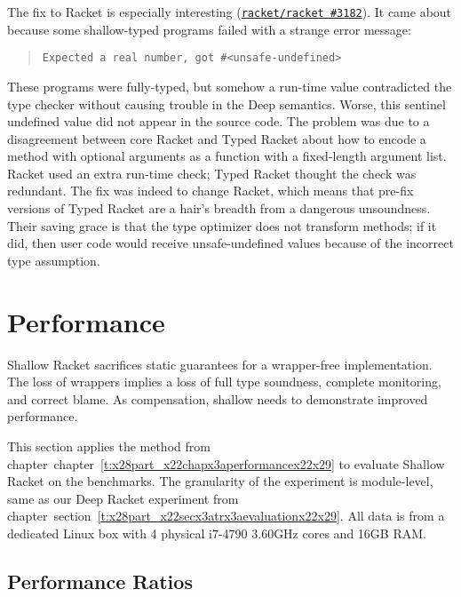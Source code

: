 \documentclass[ twoside,open=right,titlepage,numbers=noenddot,headinclude,%
                footinclude=true,cleardoublepage=empty,abstract=off,
                BCOR=5mm,paper=a4,fontsize=11pt,%
                ngerman,american,%
                parts,pdfspacing]{scrreprt}
\newcommand{\ChapRef}[2]{\SecRef{#1}{#2}}
\newcommand{\SecRef}[2]{section~#1}
\newcommand{\ChapRefLocal}[3]{\hyperref[#1]{\ChapRef{#2}{#3}}}
\newcommand{\SecRefLocal}[3]{\hyperref[#1]{\SecRef{#2}{#3}}}
\newcommand{\Scribtexttt}[1]{{\texttt{#1}}}
\newcommand{\Stttextmore}{{\fontencoding{T1}\selectfont>}}
\newcommand{\Stttextless}{{\fontencoding{T1}\selectfont<}}
\newenvironment{SInsetFlow}{\begin{quote}}{\end{quote}}
\let\SOriginalthesubsubsection\thesubsubsection
\newcommand{\Ssubsection}[2]{\subsection[#1]{#2}\let\thesubsubsection\SOriginalthesubsubsection}
\newcommand{\Ssubsubsection}[2]{\subsubsection[#1]{#2}}
\renewcommand{\Ssubsection}[2]{\section[#1]{#2}}
\renewcommand{\Ssubsubsection}[2]{\subsection[#1]{#2}}
\renewcommand{\ChapRefLocal}[3]{chapter~\ref{#1}}
\renewcommand{\SecRefLocal}[3]{section~\ref{#1}}
\begin{document}
The fix to Racket is especially interesting (\href{https://github.com/racket/racket/pull/3182}{\Scribtexttt{racket/racket \#3182}}).
It came about because some shallow{-}typed programs failed with a strange error message:

\begin{SInsetFlow}\Scribtexttt{Expected a real number, got \#{\Stttextless}unsafe{-}undefined{\Stttextmore}}\end{SInsetFlow}

\noindent{}These programs were fully{-}typed, but somehow a run{-}time value
 contradicted the type checker without causing trouble in the Deep semantics.
Worse, this sentinel undefined value did not appear in the source code.
The problem was due to a disagreement between core Racket and Typed Racket
 about how to encode a method with optional arguments as a function with
 a fixed{-}length argument list.
Racket used an extra run{-}time check; Typed Racket thought the check was redundant.
The fix was indeed to change Racket, which means that pre{-}fix versions of Typed Racket
 are a hair{'}s breadth from a dangerous unsoundness.
Their saving grace is that the type optimizer does not transform methods;
 if it did, then user code would receive unsafe{-}undefined values because
 of the incorrect type assumption.

\Ssubsection{Performance}{Performance}\label{t:x28part_x22secx3atransientx3aperformancex22x29}

Shallow Racket sacrifices static guarantees for a wrapper{-}free implementation.
The loss of wrappers implies a loss of full type soundness, complete monitoring,
 and correct blame.
As compensation, shallow needs to demonstrate improved performance.

This section applies the method from chapter~\ChapRefLocal{t:x28part_x22chapx3aperformancex22x29}{3}{Performance Analysis Method} to evaluate
 Shallow Racket on the  benchmarks.
The granularity of the experiment is module{-}level, same as our Deep Racket
 experiment from chapter~\SecRefLocal{t:x28part_x22secx3atrx3aevaluationx22x29}{3.5}{Application 1: Typed Racket}.
All data is from a dedicated Linux box with 4 physical
  i7{-}4790 3.60GHz cores and 16GB RAM.

\Ssubsubsection{Performance Ratios}{Performance Ratios}\label{t:x28part_x22secx3atransientx3aratiox22x29}
\end{document}
